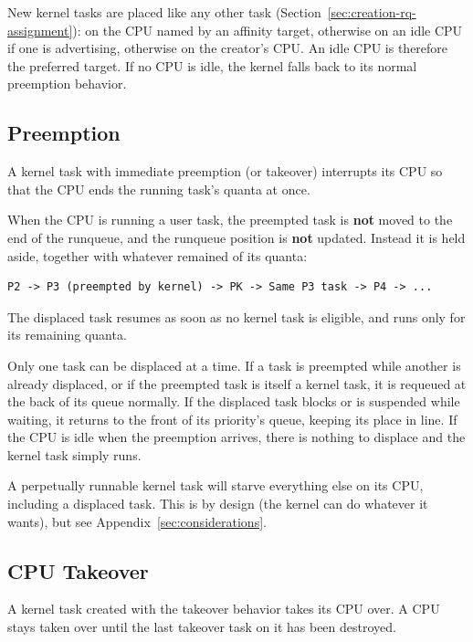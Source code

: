 \documentclass[11pt]{article}
\begin{document}
New kernel tasks are placed like any other task (Section~\ref{sec:creation-rq-assignment}): on the CPU named by an affinity target, otherwise on an idle CPU if one is advertising, otherwise on the creator's CPU.
An idle CPU is therefore the preferred target. If no CPU is idle, the kernel falls back to its normal preemption behavior.

\subsection{Preemption}
\label{sec:kernel-preemption}

A kernel task with immediate preemption (or takeover) interrupts its CPU so that the CPU ends the running task's quanta at once.

When the CPU is running a user task, the preempted task is \textbf{not} moved to the end of the runqueue, and the runqueue position is \textbf{not} updated.
Instead it is held aside, together with whatever remained of its quanta:

\begin{Verbatim}[fontsize=\small]
	P2 -> P3 (preempted by kernel) -> PK -> Same P3 task -> P4 -> ...
\end{Verbatim}

The displaced task resumes as soon as no kernel task is eligible, and runs only for its remaining quanta.

Only one task can be displaced at a time. If a task is preempted while another is already displaced, or if the preempted task is itself a kernel task, it is requeued at the back of its queue normally.
If the displaced task blocks or is suspended while waiting, it returns to the front of its priority's queue, keeping its place in line.
If the CPU is idle when the preemption arrives, there is nothing to displace and the kernel task simply runs.

A perpetually runnable kernel task will starve everything else on its CPU, including a displaced task. This is by design (the kernel can do whatever it wants), but see Appendix~\ref{sec:considerations}.

\subsection{CPU Takeover}
\label{sec:takeover}

A kernel task created with the takeover behavior takes its CPU over.
A CPU stays taken over until the last takeover task on it has been destroyed.
\end{document}
